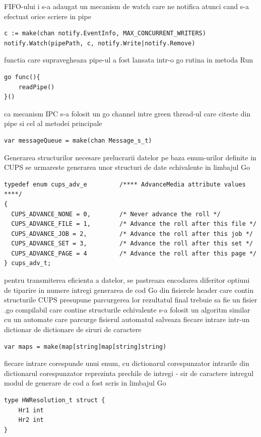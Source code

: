 \documentclass[12pt]{report}
\begin{document}
\begin{outline}
	\2 FIFO-ului i s-a adaugat un mecanism de watch care ne notifica atunci cand s-a efectuat orice scriere in pipe
\begin{lstlisting}[caption={watch pentru named pipe - golang},captionpos=b]
c := make(chan notify.EventInfo, MAX_CONCURRENT_WRITERS)
notify.Watch(pipePath, c, notify.Write|notify.Remove)
\end{lstlisting}

	\2 functia care supravegheaza pipe-ul a fost lansata intr-o go rutina in metoda Run
\begin{lstlisting}[caption={apel readPipe in go routina separata - golang},captionpos=b]
go func(){
	readPipe()
}()
\end{lstlisting}
	\2 ca mecanism IPC s-a folosit un go channel intre green thread-ul care citeste din pipe si cel al metodei principale
\begin{lstlisting}[caption={instantiere canal - golang},captionpos=b]
var messageQueue = make(chan Message_s_t)
\end{lstlisting}

\1 {\large Generarea structurilor necesare prelucrarii datelor}
	\2 pe baza enum-urilor definite in CUPS se urmareste generarea unor structuri de date echivalente in limbajul Go
\begin{lstlisting}[caption={exemplu enum CUPS - C},captionpos=b]
typedef enum cups_adv_e			/**** AdvanceMedia attribute values ****/
{
  CUPS_ADVANCE_NONE = 0,		/* Never advance the roll */
  CUPS_ADVANCE_FILE = 1,		/* Advance the roll after this file */
  CUPS_ADVANCE_JOB = 2,			/* Advance the roll after this job */
  CUPS_ADVANCE_SET = 3,			/* Advance the roll after this set */
  CUPS_ADVANCE_PAGE = 4			/* Advance the roll after this page */
} cups_adv_t;

\end{lstlisting}
	\2 pentru transmiterea eficienta a datelor, se pastreaza encodarea diferitor optiuni de tiparire in numere intregi
	\2 generarea de cod Go din fisierele header care contin structurile CUPS presupune parcurgerea lor
	\2 rezultatul final trebuie sa fie un fisier .go compilabil care contine structurile echivalente
	\2 s-a folosit un algoritm similar cu un automate care parcurge fisierul
	\2 automatul salveaza fiecare intrare intr-un dictionar de dictionare de siruri de caractere
\begin{lstlisting}[caption={instantiere dictionar - golang},captionpos=b]
var maps = make(map[string]map[string]string)
\end{lstlisting}
	\2 fiecare intrare corespunde unui enum, cu dictionarul corespunzator
	\2 intrarile din dictionarul corespunzator reprezinta prechile de intregi - sir de caractere
	\2 intregul modul de generare de cod a fost scris in limbajul Go
\begin{lstlisting}[caption={structuri de date pentru generator/procesor date - golang},captionpos=b]
type HWResolution_t struct {
	Hr1 int
	Hr2 int
}


\end{lstlisting}
\end{outline}
\end{document}
